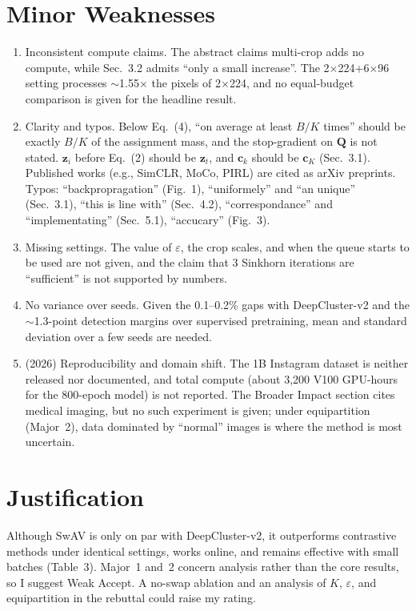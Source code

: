 \documentclass[10pt,twocolumn,letterpaper]{article}
\begin{document}
\section{Minor Weaknesses}
\begin{enumerate}
    \item Inconsistent compute claims. The abstract claims multi-crop adds no compute, while Sec.~3.2 admits ``only a small increase''. The 2$\times$224+6$\times$96 setting processes $\sim$1.55$\times$ the pixels of 2$\times$224, and no equal-budget comparison is given for the headline result.

    \item Clarity and typos. Below Eq.~(4), ``on average at least $B/K$ times'' should be exactly $B/K$ of the assignment mass, and the stop-gradient on $\mathbf{Q}$ is not stated. $\mathbf{z}_i$ before Eq.~(2) should be $\mathbf{z}_t$, and $\mathbf{c}_k$ should be $\mathbf{c}_K$ (Sec.~3.1). Published works (e.g., SimCLR, MoCo, PIRL) are cited as arXiv preprints. Typos: ``backpropragation'' (Fig.~1), ``uniformely'' and ``an unique'' (Sec.~3.1), ``this is line with'' (Sec.~4.2), ``correspondance'' and ``implementating'' (Sec.~5.1), ``accucary'' (Fig.~3).

    \item Missing settings. The value of $\varepsilon$, the crop scales, and when the queue starts to be used are not given, and the claim that 3 Sinkhorn iterations are ``sufficient'' is not supported by numbers.

    \item No variance over seeds. Given the 0.1--0.2\% gaps with DeepCluster-v2 and the $\sim$1.3-point detection margins over supervised pretraining, mean and standard deviation over a few seeds are needed.

    \item (2026) Reproducibility and domain shift. The 1B Instagram dataset is neither released nor documented, and total compute (about 3{,}200 V100 GPU-hours for the 800-epoch model) is not reported. The Broader Impact section cites medical imaging, but no such experiment is given; under equipartition (Major~2), data dominated by ``normal'' images is where the method is most uncertain.
\end{enumerate}

\section{Justification}
Although SwAV is only on par with DeepCluster-v2, it outperforms contrastive methods under identical settings, works online, and remains effective with small batches (Table~3). Major~1 and~2 concern analysis rather than the core results, so I suggest Weak Accept. A no-swap ablation and an analysis of $K$, $\varepsilon$, and equipartition in the rebuttal could raise my rating.
\end{document}
